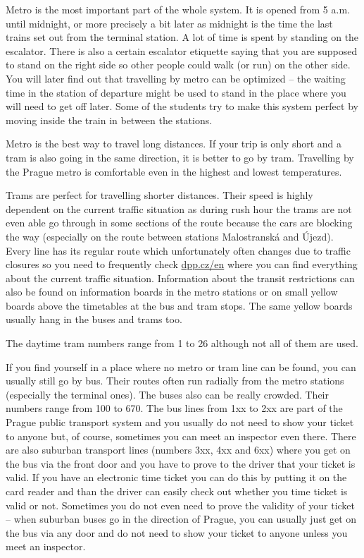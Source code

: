 Metro is the most important part of the whole system. It is opened from 5 a.m.
until midnight, or more precisely a bit later as midnight is the time the last
trains set out from the terminal station.
A lot of time is spent by standing on the escalator. There is also a certain
escalator etiquette saying that you are supposed to stand on the right side so
other people could walk (or run) on the other side.
You will later find out that travelling by metro can be optimized -- the waiting
time in the station of departure might be used to stand in the place where you
will need to get off later.
Some of the students try to make this system perfect by moving inside the train
in between the stations.

Metro is the best way to travel long distances. If your trip is only short and a
tram is also going in the same direction, it is better to go by tram.
Travelling by the Prague metro is comfortable even in the highest and lowest
temperatures.

Trams are perfect for travelling shorter distances.
Their speed is highly dependent on the current traffic situation as during rush
hour the trams are not even able go through in some sections of the route
because the cars are blocking the way (especially on the route between stations
Malostranská and Újezd).
Every line has its regular route which unfortunately often changes due to
traffic closures so you need to frequently check \url{dpp.cz/en} where you can
find everything about the current traffic situation.
Information about the transit restrictions can also be found on information
boards in the metro stations or on small yellow boards above the timetables at
the bus and tram stops.
The same yellow boards usually hang in the buses and trams too.

The daytime tram numbers range from 1 to 26 although not all of them are used.

If you find yourself in a place where no metro or tram line can be found, you
can usually still go by bus. Their routes often run radially from the metro
stations (especially the terminal ones).
The buses also can be really crowded. Their numbers range from 100 to 670.
The bus lines from 1xx to 2xx are part of the Prague public transport system and
you usually do not need to show your ticket to anyone but, of course, sometimes
you can meet an inspector even there.
There are also suburban transport lines (numbers 3xx, 4xx and 6xx) where you get
on the bus via the front door and you have to prove to the driver that your
ticket is valid.
If you have an electronic time ticket you can do this by putting it on the card
reader and than the driver can easily check out whether you time ticket is valid
or not.
Sometimes you do not even need to prove the validity of your ticket -- when
suburban buses go in the direction of Prague, you can usually just get on the
bus via any door and do not need to show your ticket to anyone unless you meet
an inspector.

